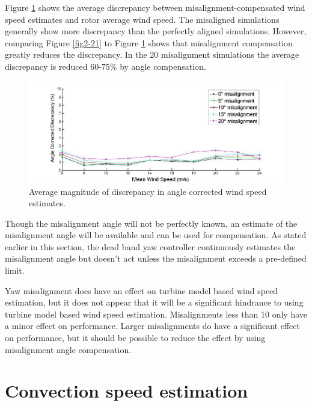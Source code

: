Figure \ref{fig2-24} shows the average discrepancy between misalignment-compensated wind speed estimates and rotor average wind speed. The misaligned simulations generally show more discrepancy than the perfectly aligned simulations. However, comparing Figure \ref{fig2-21} to Figure \ref{fig2-24} shows that misalignment compensation greatly reduces the discrepancy. In the 20\degree{} misalignment simulations the average discrepancy is reduced 60-75\% by angle compensation.


\begin{figure}[htbp]
	\centering
		\includegraphics[width = \linewidth]{Figures/ch2Figures/fig2-24.jpg}
		
	\caption{Average magnitude of discrepancy in angle corrected wind speed estimates.}
	\label{fig2-24}
\end{figure}


Though the misalignment angle will not be perfectly known, an estimate of the misalignment angle will be available and can be used for compensation. As stated earlier in this section, the dead band yaw controller continuously estimates the misalignment angle but doesn$'$t act unless the misalignment exceeds a pre-defined limit. 

Yaw misalignment does have an effect on turbine model based wind speed estimation, but it does not appear that it will be a significant hindrance to using turbine model based wind speed estimation. Misalignments less than 10\degree{} only have a minor effect on performance. Larger misalignments do have a significant effect on performance, but it should be possible to reduce the effect by using misalignment angle compensation.






\section{Convection speed estimation} \label{section2-5}

